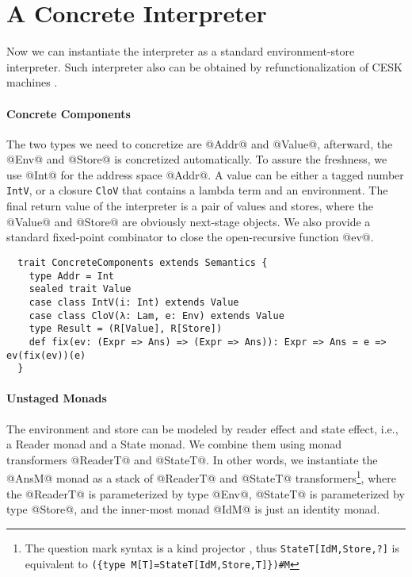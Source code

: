 
\section{A Concrete Interpreter} \label{unstaged_conc}

Now we can instantiate the interpreter as a standard environment-store
interpreter. Such interpreter also can be obtained by refunctionalization of
CESK machines \cite{Felleisen:1987:CAH:41625.41654, DBLP:conf/ppdp/AgerBDM03}.

\paragraph{Concrete Components}
The two types we need to concretize are @Addr@ and @Value@, afterward, the @Env@
and @Store@ is concretized automatically. To assure the freshness, we use @Int@
for the address space @Addr@. A value can be either a tagged number
\texttt{IntV}, or a closure \texttt{CloV} that contains a lambda term and an
environment. The final return value of the interpreter is a pair of values and
stores, where the @Value@ and @Store@ are obviously next-stage objects. We also
provide a standard fixed-point combinator to close the open-recursive function @ev@.

\begin{lstlisting}
  trait ConcreteComponents extends Semantics {
    type Addr = Int
    sealed trait Value
    case class IntV(i: Int) extends Value
    case class CloV(λ: Lam, e: Env) extends Value
    type Result = (R[Value], R[Store])
    def fix(ev: (Expr => Ans) => (Expr => Ans)): Expr => Ans = e => ev(fix(ev))(e)
  }
\end{lstlisting}

\paragraph{Unstaged Monads}
The environment and store can be modeled by reader effect and state effect,
i.e., a Reader monad and a State monad. We combine them using monad transformers
@ReaderT@ and @StateT@.
In other words, we instantiate the @AnsM@ monad as a stack of @ReaderT@ and @StateT@
transformers\footnote{The question mark syntax is a kind projector
  \cite{kindprojector}, thus \texttt{StateT[IdM,Store,?]} is equivalent to \newline
  \texttt{(\{type M[T]=StateT[IdM,Store,T]\})\#M}}, where the @ReaderT@ is
parameterized by type @Env@, @StateT@ is parameterized by type @Store@, and the
inner-most monad @IdM@ is just an identity monad.

